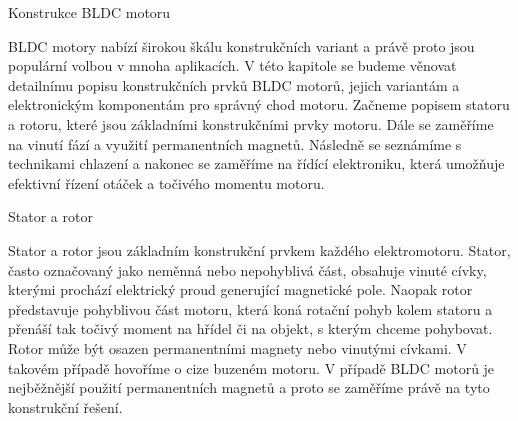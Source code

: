 
%
%

\chap Konstrukce BLDC motoru

BLDC motory nabízí širokou škálu konstrukčních variant a právě proto jsou populární volbou v mnoha aplikacích. 
V této kapitole se budeme věnovat detailnímu popisu konstrukčních prvků BLDC motorů, jejich variantám a
 elektronickým komponentám pro správný chod motoru. Začneme popisem statoru a rotoru, které jsou základními 
 konstrukčními prvky motoru. Dále se zaměříme na vinutí fází a využití permanentních magnetů. 
 Následně se seznámíme s technikami chlazení a nakonec se zaměříme na řídící elektroniku, která 
 umožňuje efektivní řízení otáček a točivého momentu motoru. 


\sec Stator a rotor

Stator a rotor jsou základním konstrukční prvkem každého elektromotoru. Stator, často označovaný jako neměnná nebo nepohyblivá část, obsahuje vinuté cívky, kterými prochází elektrický
 proud generující magnetické pole. Naopak rotor představuje pohyblivou část motoru, která koná rotační pohyb kolem statoru a přenáší tak točivý moment na hřídel či na objekt, s kterým chceme pohybovat. 
 Rotor může být osazen permanentními magnety nebo vinutými cívkami. V takovém případě hovoříme o cize buzeném motoru. V případě BLDC motorů je nejběžnější použití permanentních magnetů a proto se 
 zaměříme právě na tyto konstrukční řešení. 

